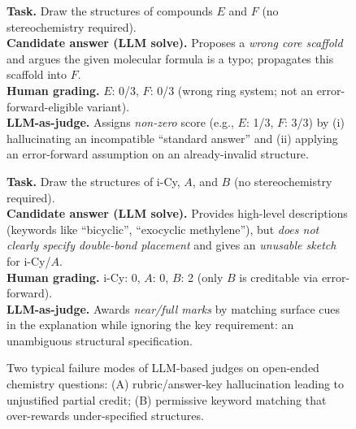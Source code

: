 \documentclass[11pt]{article}
\begin{document}
\begin{figure}[!h]
    \centering

    \begin{tcolorbox}[
      title={Case A: \textbf{Mis-grounded rubric} $\Rightarrow$ spurious partial credit (IChO'25 Q1.3)},
      colback=gray!3,
      colframe=black!35,
      boxrule=0.6pt,
      arc=1.5mm,
      left=1.5mm,right=1.5mm,top=1mm,bottom=1mm
    ]
    \footnotesize
    \textbf{Task.} Draw the structures of compounds $E$ and $F$ (no stereochemistry required).\\
    \textbf{Candidate answer (LLM solve).} Proposes a \emph{wrong core scaffold} and argues the given molecular
    formula is a typo; propagates this scaffold into $F$.\\
    \textbf{Human grading.} $E$: 0/3,\; $F$: 0/3 (wrong ring system; not an error-forward-eligible variant).\\
    \textbf{LLM-as-judge.} Assigns \emph{non-zero} score (e.g., $E$: 1/3, $F$: 3/3) by (i) hallucinating an
    incompatible ``standard answer'' and (ii) applying an error-forward assumption on an already-invalid structure.
    \end{tcolorbox}

    \vspace{-0.7em}

    \begin{tcolorbox}[
      title={Case B: \textbf{Overly permissive} $\Rightarrow$ vague structures counted as correct (IChO'25 Q1.1)},
      colback=gray!3,
      colframe=black!35,
      boxrule=0.6pt,
      arc=1.5mm,
      left=1.5mm,right=1.5mm,top=1mm,bottom=1mm
    ]
    \footnotesize
    \textbf{Task.} Draw the structures of i-Cy, $A$, and $B$ (no stereochemistry required).\\
    \textbf{Candidate answer (LLM solve).} Provides high-level descriptions (keywords like ``bicyclic'',
    ``exocyclic methylene''), but \emph{does not clearly specify double-bond placement} and gives an
    \emph{unusable sketch} for i-Cy/$A$.\\
    \textbf{Human grading.} i-Cy: 0,\; $A$: 0,\; $B$: 2 (only $B$ is creditable via error-forward).\\
    \textbf{LLM-as-judge.} Awards \emph{near/full marks} by matching surface cues in the explanation while ignoring
    the key requirement: an unambiguous structural specification.
    \end{tcolorbox}

    \caption{Two typical failure modes of LLM-based judges on open-ended chemistry questions:
    (A) rubric/answer-key hallucination leading to unjustified partial credit; (B) permissive keyword matching that
    over-rewards under-specified structures.}
    \label{fig:judge_cases}
\end{figure}
\end{document}
